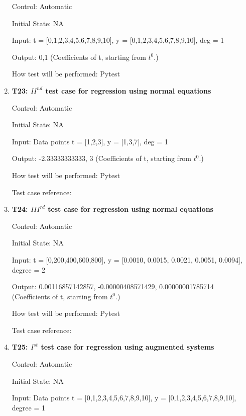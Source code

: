 \documentclass[12pt, titlepage]{article}
\begin{document}
\begin{enumerate}
Control: Automatic

Initial State: NA

Input: t = [0,1,2,3,4,5,6,7,8,9,10], y = [0,1,2,3,4,5,6,7,8,9,10], deg = 1 

Output: 0,1 (Coefficients of t, starting from $t^{0}$.)

How test will be performed: Pytest\\


\item{\textbf{T23: ${II}^{nd}$ test case for regression using normal 
equations}\\}

Control: Automatic

Initial State: NA

Input: Data points t = [1,2,3], y = [1,3,7], deg = 1

Output: -2.33333333333, 3 (Coefficients of t, starting from $t^{0}$.)

How test will be performed: Pytest

Test case reference: ~\cite{RegNormal}\\


\item{\textbf{T24: ${III}^{rd}$ test case for regression using normal equations 
}\\}

Control: Automatic

Initial State: NA

Input: t = [0,200,400,600,800], y = [0.0010, 0.0015, 0.0021, 0.0051, 0.0094], degree = 2

Output: 0.00116857142857, -0.00000408571429, 0.00000001785714 (Coefficients of t, starting from $t^{0}$.)

How test will be performed: Pytest

Test case reference:~\cite{RegNormal}\\



\item{\textbf{T25: $I^{st}$ test case for regression using augmented systems}\\}

Control: Automatic

Initial State: NA

Input: Data points t = [0,1,2,3,4,5,6,7,8,9,10], y = [0,1,2,3,4,5,6,7,8,9,10], degree = 1 


\end{enumerate}
\end{document}
